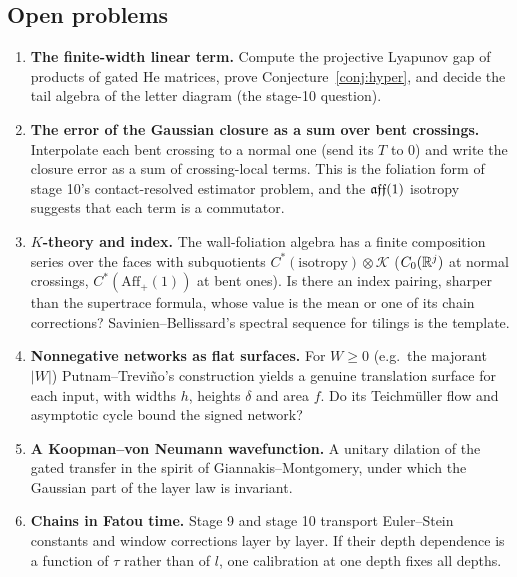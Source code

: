 \subsection{Open problems}
\begin{enumerate}[leftmargin=*]
\item \textbf{The finite-width linear term.} Compute the projective Lyapunov gap of products of gated He matrices, prove
Conjecture~\ref{conj:hyper}, and decide the tail algebra of the letter diagram (the stage-10 question).
\item \textbf{The error of the Gaussian closure as a sum over bent crossings.} Interpolate each bent crossing to a normal one (send its
$T$ to $0$) and write the closure error as a sum of crossing-local terms. This is the foliation form of stage 10's contact-resolved
estimator problem, and the $\mathfrak{aff}(1)$ isotropy suggests that each term is a commutator.
\item \textbf{$K$-theory and index.} The wall-foliation algebra has a finite composition series over the faces with subquotients
$C^*(\text{isotropy})\otimes\mathcal K$ ($C_0(\mathbb R^j)$ at normal crossings, $C^*(\mathrm{Aff}_+(1))$ at bent ones). Is there an index pairing, sharper than
the supertrace formula, whose value is the mean or one of its chain corrections? Savinien--Bellissard's spectral sequence for tilings is
the template.
\item \textbf{Nonnegative networks as flat surfaces.} For $W\ge0$ (e.g.\ the majorant $|W|$) Putnam--Trevi\~no's construction yields a
genuine translation surface for each input, with widths $h$, heights $\delta$ and area $f$. Do its Teichm\"uller flow and asymptotic cycle bound
the signed network?
\item \textbf{A Koopman--von Neumann wavefunction.} A unitary dilation of the gated transfer in the spirit of Giannakis--Montgomery,
under which the Gaussian part of the layer law is invariant.
\item \textbf{Chains in Fatou time.} Stage 9 and stage 10 transport Euler--Stein constants and window corrections layer by layer. If their
depth dependence is a function of $\tau$ rather than of $l$, one calibration at one depth fixes all depths.
\end{enumerate}
